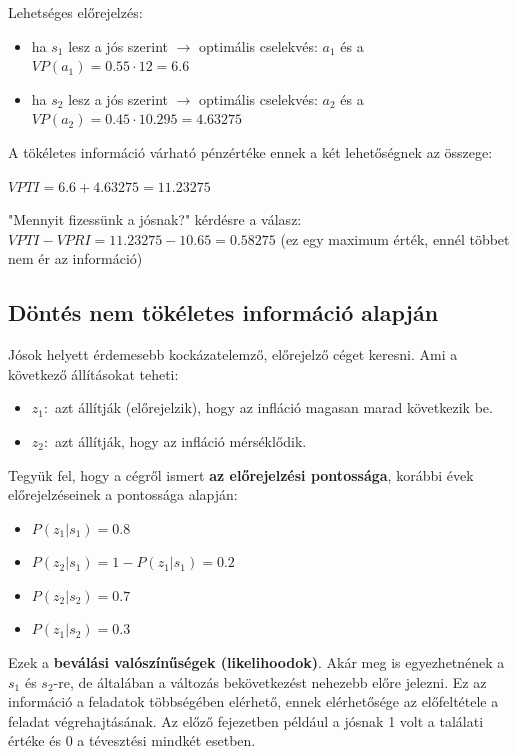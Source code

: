 \documentclass[a4paper,12pt]{article}
\begin{document}
Lehetséges előrejelzés:
\begin{itemize}
\item ha $s_{1}$ lesz a jós szerint $\rightarrow$ optimális cselekvés: $a_1$  és a $VP(a_1) = 0.55\cdot 12 = 6.6$
\item ha $s_{2}$ lesz a jós szerint $\rightarrow$ optimális cselekvés: $a_2$  és a $VP(a_2) = 0.45\cdot 10.295 = 4.63275$
\end{itemize}

A tökéletes információ várható pénzértéke ennek a két lehetőségnek az összege: 

$VPTI = 6.6 + 4.63275 = 11.23275$

"Mennyit fizessünk a jósnak?" kérdésre a válasz: $VPTI - VPRI = 11.23275 - 10.65 = 0.58275$ (ez egy maximum érték, ennél többet nem ér az információ)

\subsection{Döntés nem tökéletes információ alapján}

Jósok helyett érdemesebb kockázatelemző, előrejelző céget keresni. Ami a következő állításokat teheti:
\begin{itemize}
\item $z_{1}:$ azt állítják (előrejelzik), hogy az infláció magasan marad következik be.  %
\item $z_{2}:$ azt állítják, hogy az infláció mérséklődik. %
\end{itemize}

Tegyük fel, hogy a cégről ismert \textbf{az előrejelzési pontossága}, korábbi évek előrejelzéseinek a pontossága alapján:
\begin{itemize}
\item $P(z_{1}|s_1) = 0.8$ 
\item $P(z_{2}|s_1) = 1- P(z_{1}|s_1) = 0.2$
\item $P(z_{2}|s_2) = 0.7$ 
\item $P(z_{1}|s_2) = 0.3$ 
\end{itemize}
Ezek a \textbf{beválási valószínűségek (likelihoodok)}. Akár meg is egyezhetnének a $s_1$ és $s_2$-re, de általában a változás bekövetkezést nehezebb előre jelezni. Ez az információ a feladatok többségében elérhető, ennek elérhetősége az előfeltétele a feladat végrehajtásának. Az előző fejezetben például a jósnak 1 volt a találati értéke és 0 a tévesztési mindkét esetben.
\end{document}
